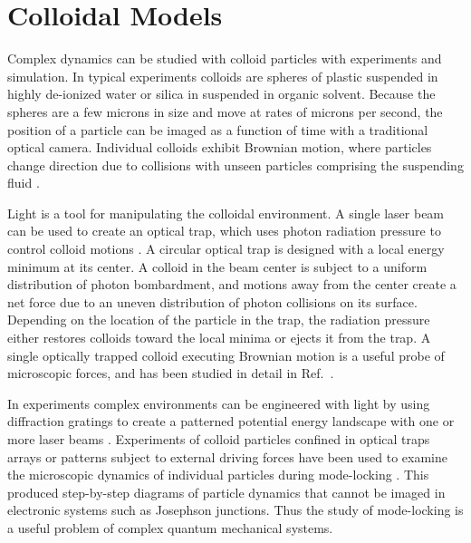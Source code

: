\documentclass[twocolumn,preprintnumbers,amsmath,amssymb,aps,prx]{revtex4}
\begin{document}
\section{Colloidal Models}
\label{sec:colloids}

Complex dynamics can be studied with
colloid particles with experiments and simulation.
In typical experiments colloids are spheres of 
plastic suspended in
highly de-ionized water or silica in suspended in organic solvent.
Because 
the spheres are a few microns in size
and move at rates of microns per second,
the position of a particle %
can be imaged as a function of time 
with a traditional optical camera.
Individual colloids exhibit 
Brownian motion,
where particles change direction %
due to 
collisions 
with unseen particles comprising the suspending fluid \cite{}.

Light is a
tool for manipulating the colloidal environment.
A single laser beam can be used to create an optical trap,
which uses 
photon radiation pressure to
control colloid motions \cite{Ashkin1997}.
A circular optical trap is designed
with a local energy minimum 
at its center.
A colloid in the beam center is subject to a
uniform distribution of photon bombardment,
and motions away from the center create a net force
due to an uneven 
distribution of photon collisions on its surface.
Depending on the %
location of the particle in the trap,
the radiation pressure either restores colloids toward the local minima
or ejects it from the trap.
A single optically trapped colloid executing Brownian motion
is a useful probe of microscopic forces,
and has been studied in detail in Ref.~\cite{Volpe2013}.

In experiments  
 complex environments can be
 engineered with light by %
 using diffraction gratings to create a patterned
 potential energy landscape 
 with one or more laser beams \cite{}.
Experiments of colloid particles confined
in optical traps arrays or patterns 
subject to external driving forces 
have
been used to examine the microscopic dynamics
of individual particles during mode-locking \cite{Juniper2015}.
This produced step-by-step diagrams
of particle dynamics that cannot be 
imaged in electronic systems such as Josephson junctions.
Thus the study of
mode-locking is a useful problem
of complex quantum mechanical systems.
\end{document}
